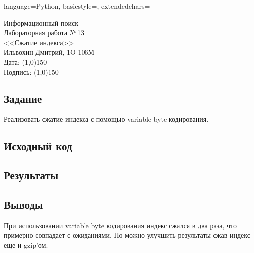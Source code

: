 \documentclass[12pt]{article}
\newcommand{\StudentName}{Ильвохин Дмитрий}
\newcommand{\Group}{1O-106М}
\newcommand{\CourseName}{Информационный поиск}
\newcommand{\LabNum}{13}
\newcommand{\Subject}{Сжатие индекса}
\begin{document}
\lstset
{
        language=Python,
        basicstyle=\footnotesize,%
        extendedchars=\true
}

\begin{flushright}
\Large{
	\CourseName \\
	Лабораторная работа №\,\LabNum \\
	<<\Subject>> \\
  \StudentName, \Group \\
  Дата: \line(1,0){150} \\
  Подпись: \line(1,0){150} \\
}
\end{flushright}

\subsection*{Задание}
Реализовать сжатие индекса с помощью variable byte кодирования.

\subsection*{Исходный код}


\subsection*{Результаты}


\subsection*{Выводы}
При использовании variable byte кодирования индекс сжался в два раза, что примерно
совпадает с ожиданиями. Но можно улучшить результаты сжав индекс еще и gzip'ом.
\end{document}
